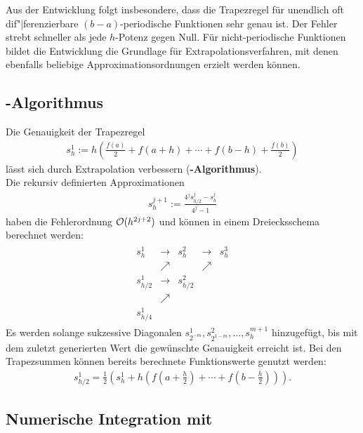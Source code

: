 Aus der Entwicklung folgt insbesondere, dass die Trapezregel für unendlich oft
dif"|ferenzierbare $(b - a)$-periodische Funktionen sehr genau ist.
Der Fehler strebt schneller als jede $h$-Potenz gegen Null.
Für nicht-periodische Funktionen bildet die Entwicklung die Grundlage für
Extrapolationsverfahren, mit denen ebenfalls beliebige
Approximationsordnungen erzielt werden können.

\subsection{%
    -Algorithmus%
}

Die Genauigkeit der Trapezregel
\begin{align*}
    s_h^1 := h \left(\frac{f(a)}{2} + f(a + h) + \dotsb +
    f(b - h) + \frac{f(b)}{2}\right)
\end{align*}
lässt sich durch Extrapolation verbessern
(\textbf{-Algorithmus}). \\
Die rekursiv definierten Approximationen
\begin{align*}
    s_h^{j+1} := \frac{4^j s_{h/2}^j - s_h^j}{4^j - 1}
\end{align*}
haben die Fehlerordnung $\mathcal{O}(h^{2j+2})$ und können in einem Dreiecksschema
berechnet werden:
\begin{align*}
    \begin{array}{ccccc}
        s_h^1 & \rightarrow & s_h^2 & \rightarrow & s_h^3 \\
        & \nearrow & & \nearrow \\
        s_{h/2}^1 & \rightarrow & s_{h/2}^2 \\
        & \nearrow \\
        s_{h/4}^1
    \end{array}
\end{align*}
Es werden solange sukzessive Diagonalen
$s_{2^{-m}}^1, s_{2^{1-m}}^2, \dotsc, s_h^{m+1}$ hinzugefügt, bis mit dem
zuletzt generierten Wert die gewünschte Genauigkeit erreicht ist.
Bei den Trapezsummen können bereits berechnete Funktionswerte genutzt werden:
\begin{align*}
    s_{h/2}^1 = \frac{1}{2} \left(s_h^1 +
    h \left(f(a + \tfrac{h}{2}) + \dotsb +
    f\left(b - \tfrac{h}{2}\right)\right)\right).
\end{align*}

\pagebreak

\subsection{%
    Numerische Integration mit \matlab{}%
}

